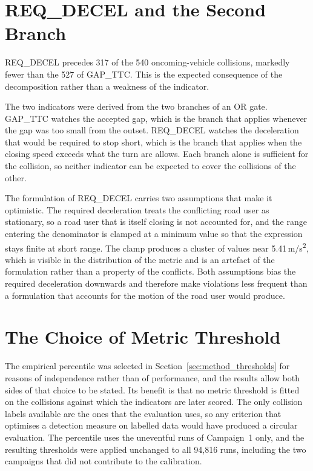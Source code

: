 \section{REQ\_DECEL and the Second Branch}
\label{sec:disc_reqdecel}

REQ\_DECEL precedes 317 of the 540 oncoming-vehicle collisions, markedly fewer
than the 527 of GAP\_TTC. This is the expected consequence of the decomposition
rather than a weakness of the indicator.

The two indicators were derived from the two branches of an OR gate. GAP\_TTC
watches the accepted gap, which is the branch that applies whenever the gap was
too small from the outset. REQ\_DECEL watches the deceleration that would be
required to stop short, which is the branch that applies when the closing speed
exceeds what the turn arc allows. Each branch alone is sufficient for the
collision, so neither indicator can be expected to cover the collisions of the
other.

The formulation of REQ\_DECEL carries two assumptions that make it optimistic.
The required deceleration treats the conflicting road user as stationary, so a road user
that is itself closing is not accounted for, and the range entering the
denominator is clamped at a minimum value so that the expression stays finite at
short range. The clamp produces a cluster of values near 5.41\,m/s\textsuperscript{2},
which is visible in the distribution of the metric and is an artefact of the
formulation rather than a property of the conflicts. Both assumptions bias the
required deceleration downwards and therefore make violations less frequent than
a formulation that accounts for the motion of the road user would produce.

\section{The Choice of Metric Threshold}
\label{sec:disc_threshold}

The empirical percentile was selected in Section~\ref{sec:method_thresholds} for
reasons of independence rather than of performance, and the results allow both
sides of that choice to be stated. Its benefit is that no metric threshold is fitted on the collisions against which
the indicators are later scored. The only collision labels available are the ones
that the evaluation uses, so any criterion that optimises a detection measure on
labelled data would have produced a circular evaluation. The percentile uses the
uneventful runs of Campaign~1 only, and the resulting thresholds were applied
unchanged to all 94,816 runs, including the two campaigns that did not
contribute to the calibration.

